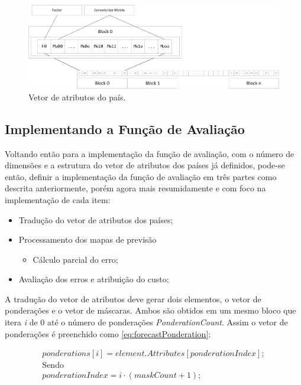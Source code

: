 \begin{figure}[h]
	\centering	\includegraphics[scale=0.45]{Figuras/VetorAtributosForecast-Ingles.png}
	\caption{Vetor de atributos do país.}
	\label{fig:VetorAtributosForecast-Ingles}
\end{figure}


\subsection{Implementando a Função de Avaliação}
\label{Implementando a Função de Avaliação}

Voltando então para a implementação da função de avaliação, com o número de dimensões e a estrutura do vetor de atributos dos países já definidos, pode-se então, definir a implementação da função de avaliação em três partes como descrita anteriormente, porém agora mais resumidamente e com foco na implementação de cada item:

\begin{itemize}
\item Tradução do vetor de atributos dos países;
\item Processamento dos mapas de previsão 
\begin{itemize}
\item Cálculo parcial do erro;
\end{itemize}
\item Avaliação dos erros e atribuição do custo;
\end{itemize}

A tradução do vetor de atributos deve gerar dois elementos, o vetor de ponderações e o vetor de máscaras. Ambos são obtidos em um mesmo bloco que itera \emph{i} de 0 até o número de ponderações \emph{PonderationCount}. Assim o vetor de ponderações é preenchido como \ref{eq:forecastPonderation}:
	
\begin{equation}
\label{eq:forecastPonderation}
\begin{split}
ponderations[i] = element.Attributes[ponderationIndex];\\
\text{Sendo}\\
ponderationIndex = i \cdot (maskCount + 1);
\end{split}
\end{equation}



